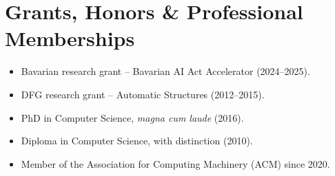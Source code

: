 \documentclass[11pt,a4paper,sans]{moderncv}
\begin{document}

\section{Grants, Honors \& Professional Memberships}
\vspace{1pt}
\begin{itemize}
\item{Bavarian research grant -- Bavarian AI Act Accelerator (2024--2025).}
\item{DFG research grant -- Automatic Structures (2012--2015).}
\item{PhD in Computer Science, \textit{magna cum laude} (2016).}
\item{Diploma in Computer Science, with distinction (2010).}
\item{Member of the Association for Computing Machinery (ACM) since 2020.}
\end{itemize}

\end{document}
